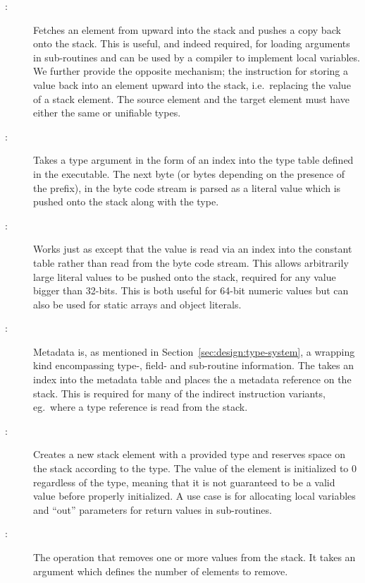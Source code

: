 \begin{description}

\item[:]

  Fetches an element from upward into the stack and pushes a copy back onto the
  stack. This is useful, and indeed required, for loading arguments in
  sub-routines and can be used by a compiler to implement local variables. We
  further provide the opposite mechanism; the  instruction
  for storing a value back into an element upward into the stack, i.e.~replacing
  the value of a stack element. The source element and the target element must
  have either the same or unifiable types.

\item[:]

  Takes a type argument in the form of an index into the type table defined in
  the executable. The next byte (or bytes depending on the presence of the
   prefix), in the byte code stream is parsed as a literal value
  which is pushed onto the stack along with the type.

\item[:]

  Works just as  except that the value is read via an index
  into the constant table rather than read from the byte code stream. This
  allows arbitrarily large literal values to be pushed onto the stack, required
  for any value bigger than 32-bits. This is both useful for 64-bit numeric
  values but can also be used for static arrays and object literals.

\item[:]

  Metadata is, as mentioned in Section~\ref{sec:design:type-system}, a wrapping
  kind encompassing type-, field- and sub-routine information. The
   takes an index into the metadata table and places the a
  metadata reference on the stack. This is required for many of the indirect
  instruction variants, eg.~where a type reference is read from the stack.

\item[:]

  Creates a new stack element with a provided type and reserves space on the
  stack according to the type. The value of the element is initialized to 0
  regardless of the type, meaning that it is not guaranteed to be a valid value
  before properly initialized. A use case is for allocating local variables and
  ``out'' parameters for return values in sub-routines.

\item[:]

  The operation that removes one or more values from the stack. It takes an
  argument which defines the number of elements to remove.

\end{description}

